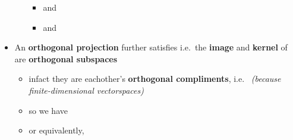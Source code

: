 \begin{itemize}
\begin{itemize}
                        \begin{itemize}

                              \item
                                     and 
                              \item
                                     and
                        \end{itemize}
            \end{itemize}
      \item
            An \textbf{orthogonal projection} further satisfies 
            i.e.~the \textbf{image} and \textbf{kernel} of \iMbox{\pi} are
            \textbf{orthogonal subspaces}

            \begin{itemize}

                  \item
                        infact they are eachother's \textbf{orthogonal compliments},
                        i.e.~ \emph{(because
                              finite-dimensional vectorspaces)}
                  \item
                        so we have
                  \item
                        or equivalently,
            \end{itemize}
\end{itemize}

\hSep %

